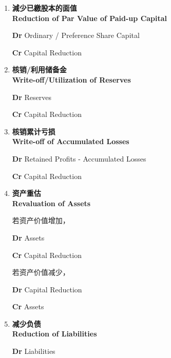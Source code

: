 \documentclass{article}
\begin{document}
\begin{enumerate}
    \item \textbf{減少已繳股本的面值\\Reduction of Par Value of Paid-up Capital}
    \begin{mdframed}[backgroundcolor=gray!10]
    \textbf{Dr} Ordinary / Preference Share Capital

    \hspace{1.7em}\textbf{Cr} Capital Reduction
    \end{mdframed}

    \newpage
    \item \textbf{核销/利用储备金\\Write-off/Utilization of Reserves}
    \begin{mdframed}[backgroundcolor=gray!10]
    \textbf{Dr} Reserves

    \hspace{1.7em}\textbf{Cr} Capital Reduction
    \end{mdframed}

    \item \textbf{核销累计亏损\\Write-off of Accumulated Losses}
    \begin{mdframed}[backgroundcolor=gray!10]
    \textbf{Dr} Retained Profits - Accumulated Losses

    \hspace{1.7em}\textbf{Cr} Capital Reduction
    \end{mdframed}

    \item \textbf{资产重估\\Revaluation of Assets}
    
    若资产价值增加，
    \begin{mdframed}[backgroundcolor=gray!10]
    \textbf{Dr} Assets

    \hspace{1.7em}\textbf{Cr} Capital Reduction
    \end{mdframed}

    若资产价值减少，
    \begin{mdframed}[backgroundcolor=gray!10]
    \textbf{Dr} Capital Reduction

    \hspace{1.7em}\textbf{Cr} Assets
    \end{mdframed}

    \item \textbf{减少负债\\Reduction of Liabilities}
    \begin{mdframed}[backgroundcolor=gray!10]
    \textbf{Dr} Liabilities


\end{mdframed}
\end{enumerate}
\end{document}
